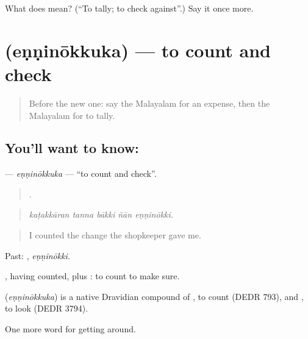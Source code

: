 \begin{tcolorbox}[breakable,colback=teal!4,colframe=teal!35!black,title={Before you move on}]
What does  mean? (\textquotedblleft{}To tally; to check against\textquotedblright{}.) Say it once more.
\end{tcolorbox}
\section[\texorpdfstring{\ml{എണ്ണിനോക്കുക} (eṇṇinōkkuka)}{എണ്ണിനോക്കുക (eṇṇinōkkuka)}]{ (eṇṇinōkkuka) — to count and check}

\label{lesson:ML-C494-enninokkuka}



\begin{quote}
Before the new one: say the Malayalam for an expense, then the Malayalam for to tally.
\end{quote}

\subsection*{You'll want to know: }
\textbf{} — \emph{eṇṇinōkkuka} — \textquotedblleft{}to count and check\textquotedblright{}.

\begin{quote}
    .
\end{quote}

\begin{quote}
\emph{kaṭakkāran tanna bākki ñān eṇṇinōkki.}
\end{quote}

\begin{quote}
I counted the change the shopkeeper gave me.
\end{quote}

Past: , \emph{eṇṇinōkki}.

, having counted, plus : to count to make sure.

\begin{cousinweb}
\textbf{} (\emph{eṇṇinōkkuka}) is a native Dravidian compound of , to count (DEDR 793), and , to look (DEDR 3794).
\end{cousinweb}

\begin{grammarlens}[title={What you've built}]
One more word for getting around.
\end{grammarlens}

